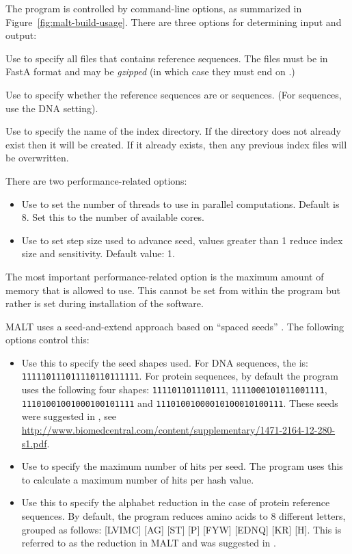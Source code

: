 \documentclass[11pt]{article}
\newcommand\MALT{{\sf MALT}\xspace}
\begin{document}
The  program is controlled by command-line options, as summarized in Figure~\ref{fig:malt-build-usage}. 
There are three options for determining input and output:
\begin{itemize}
\setlength{\itemindent}{30pt}
\item [\itt{--input}] Use to specify all files that contains reference sequences. The files must be in FastA format and
may be {\em gzipped} (in which case they must end on .) 
{
\item[\itt{--sequenceType}] Use to specify whether the reference sequences are  or  sequences.
(For  sequences, use the DNA setting).
}
\item[\itt{--index}] Use to specify the name of the index directory. If the directory does not already exist then it will be created.
If it already exists, then any previous index files will be overwritten.
\end{itemize}


There are two performance-related options:
\begin{itemize}
\setlength{\itemindent}{30pt}
\item[\itt{--threads}] Use to set the number of threads to use in parallel computations. Default is 8. Set this to
the number of available cores.
\item[\itt{--step}]  Use to set step size used to advance seed, values greater than 1 reduce index size and sensitivity. Default value: 1.
\end{itemize}
The most important performance-related option is the maximum amount of memory that 
is allowed to use. This cannot be set from within the program but rather is set during installation of the software.

\MALT uses a seed-and-extend approach based on ``spaced seeds'' \cite{Burkhardt01,Ma02}. The following options control this:
\begin{itemize}
\setlength{\itemindent}{30pt}
\item[\itt{--shapes}]
{Use this to specify the seed shapes used. For DNA sequences, the  is:
{\tt 111110111011110110111111}.} 
For protein sequences, by default the program uses the following four shapes:
{\tt 111101101110111}, {\tt 1111000101011001111}, {\tt 11101001001000100101111} and {\tt 11101001000010100010100111}.
These seeds were suggested in \cite{Ilie:2011fk}, see \url{http://www.biomedcentral.com/content/supplementary/1471-2164-12-280-s1.pdf}.
\item[\itt{--maxHitsPerSeed}] Use to specify the maximum number of hits per seed. The program uses this
to calculate a maximum number of hits per hash value.
\item[\itt{--proteinReduct}] Use this to specify the alphabet reduction in the case of protein reference sequences.
By default, the program reduces amino acids to 8 different letters, grouped as follows:
[LVIMC] [AG] [ST] [P] [FYW] [EDNQ] [KR] [H]. This is referred to as the  reduction in \MALT and
was suggested in \cite{Murphy2000}.

\end{itemize}
\end{document}
